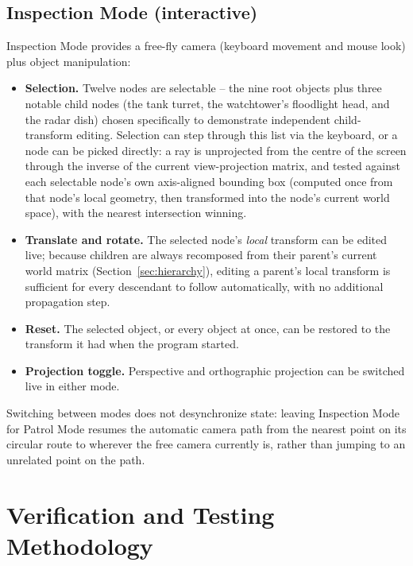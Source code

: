 \documentclass[11pt,a4paper]{article}
\begin{document}
\subsection{Inspection Mode (interactive)}
Inspection Mode provides a free-fly camera (keyboard movement and mouse
look) plus object manipulation:

\begin{itemize}[nosep]
  \item \textbf{Selection.} Twelve nodes are selectable -- the nine root
        objects plus three notable child nodes (the tank turret, the
        watchtower's floodlight head, and the radar dish) chosen
        specifically to demonstrate independent child-transform editing.
        Selection can step through this list via the keyboard, or a node
        can be picked directly: a ray is unprojected from the centre of
        the screen through the inverse of the current view-projection
        matrix, and tested against each selectable node's own
        axis-aligned bounding box (computed once from that node's local
        geometry, then transformed into the node's current world space),
        with the nearest intersection winning.
  \item \textbf{Translate and rotate.} The selected node's \emph{local}
        transform can be edited live; because children are always
        recomposed from their parent's current world matrix
        (Section~\ref{sec:hierarchy}), editing a parent's local
        transform is sufficient for every descendant to follow
        automatically, with no additional propagation step.
  \item \textbf{Reset.} The selected object, or every object at once,
        can be restored to the transform it had when the program
        started.
  \item \textbf{Projection toggle.} Perspective and orthographic
        projection can be switched live in either mode.
\end{itemize}

Switching between modes does not desynchronize state: leaving Inspection
Mode for Patrol Mode resumes the automatic camera path from the nearest
point on its circular route to wherever the free camera currently is,
rather than jumping to an unrelated point on the path.

\section{Verification and Testing Methodology}
\label{sec:testing}
\end{document}
